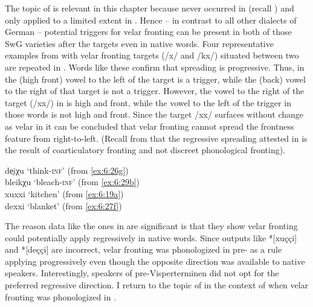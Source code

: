 The topic of  is relevant in this chapter because  never occurred in  (recall ) and only applied to a limited extent in . Hence -- in contrast to all other dialects of German -- potential triggers for velar fronting can be present in both of those SwG varieties after the targets even in native words. Four representative examples from  with velar fronting targets (/x/ and /kx/) situated between two  are repeated in . Words like these confirm that spreading is progressive. Thus, in  the (high front) vowel to the left of the target is a trigger, while the (back) vowel to the right of that target is not a trigger. However, the vowel to the right of the target (/xx/) in  is high and front, while the vowel to the left of the trigger in those words is not high and front. Since the target /xx/ surfaces without change as velar in  it can be concluded that velar fronting cannot spread the frontness feature from right-to-left. (Recall from  that the regressive spreading attested in  is the result of coarticulatory fronting and not discreet phonological fronting).

\ea \label{ex:6:60}
\ea\label{ex:6:60a}  de͔iχu   \tab  [dẽiçu]  \tab  ‘think-\textsc{inf}’  \tab  (from \ref{ex:6:26g})\\
     bleikχu  \tab [bleikçu] \tab ‘bleach-\textsc{inf}’  \tab (from \ref{ex:6:29b})\\
\ex\label{ex:6:60b}  xuxxi    \tab [xuxxi]   \tab ‘kitchen’              \tab (from \ref{ex:6:19a})\\
     dexxi    \tab [dexxi]   \tab ‘blanket’              \tab (from \ref{ex:6:27f})\\
\z 
\z 

The reason data like the ones in  are significant is that they show velar fronting could potentially apply regressively in native words. Since outputs like *[xuççi] and *[deççi] are incorrect, velar fronting was phonologized in pre- as a rule applying progressively even though the opposite direction was available to native speakers. Interestingly, speakers of pre-Vis\-per\-ter\-mi\-nen did not opt for the preferred regressive direction. I return to the topic of  in the context of when velar fronting was phonologized in .

